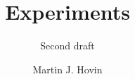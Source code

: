 \documentclass[a4paper,english]{report}
\author{Martin J. Hovin}
\begin{document}
\title{Experiments}
\subtitle{Second draft}

\maketitle


%

%
\end{document}

